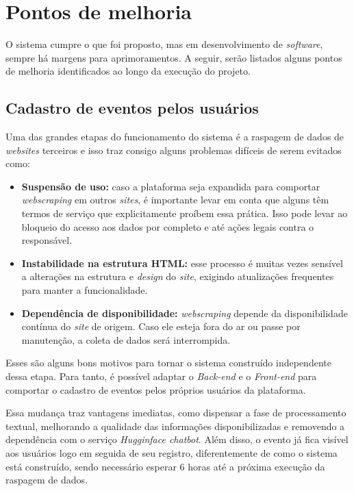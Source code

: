 
\chapter{Pontos de melhoria}

O sistema cumpre o que foi proposto, mas em desenvolvimento de
\textit{software}, sempre há margens para aprimoramentos. A seguir, serão
listados alguns pontos de melhoria identificados ao longo da execução do
projeto.

\section{Cadastro de eventos pelos usuários}

Uma das grandes etapas do funcionamento do sistema é a raspagem de dados de
\textit{websites} terceiros e isso traz consigo alguns problemas difíceis de
serem evitados como:
\begin{itemize}
    \item \textbf{Suspensão de uso:} caso a plataforma seja expandida para comportar
          \textit{webscraping} em outros \textit{sites}, é importante levar em conta que
          alguns têm termos de serviço que explicitamente proíbem essa prática. Isso pode
          levar ao bloqueio do acesso aos dados por completo e até ações legais contra o
          responsável.

    \item \textbf{Instabilidade na estrutura HTML:} esse processo é muitas vezes sensível a alterações na estrutura e \textit{design} do \textit{site}, exigindo atualizações frequentes para manter a funcionalidade.

    \item \textbf{Dependência de disponibilidade:} \textit{webscraping} depende da disponibilidade contínua do \textit{site} de origem. Caso ele esteja fora do ar ou passe por manutenção, a coleta de dados será interrompida.
\end{itemize}

Esses são alguns bons motivos para tornar o sistema construído independente
dessa etapa. Para tanto, é possível adaptar o \textit{Back-end} e o
\textit{Front-end} para comportar o cadastro de eventos pelos próprios usuários
da plataforma.

Essa mudança traz vantagens imediatas, como dispensar a fase de processamento
textual, melhorando a qualidade das informações disponibilizadas e removendo a
dependência com o serviço \textit{Hugginface chatbot}. Além disso, o evento já
fica visível aos usuários logo em seguida de seu registro, diferentemente de
como o sistema está construído, sendo necessário esperar 6 horas até a próxima
execução da raspagem de dados.

